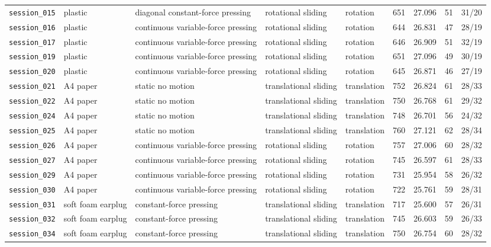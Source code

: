\documentclass[UTF8,a4paper,11pt]{ctexart}
\begin{document}
\begin{longtable}{lp{1.55cm}p{2.7cm}p{2.65cm}lrrrr}
\texttt{session\_015} & plastic & diagonal constant-force pressing & rotational sliding & rotation & 651 & 27.096 & 51 & 31/20 \\
\texttt{session\_016} & plastic & continuous variable-force pressing & rotational sliding & rotation & 644 & 26.831 & 47 & 28/19 \\
\texttt{session\_017} & plastic & continuous variable-force pressing & rotational sliding & rotation & 646 & 26.909 & 51 & 32/19 \\
\texttt{session\_019} & plastic & continuous variable-force pressing & rotational sliding & rotation & 651 & 27.096 & 49 & 30/19 \\
\texttt{session\_020} & plastic & continuous variable-force pressing & rotational sliding & rotation & 645 & 26.871 & 46 & 27/19 \\
\texttt{session\_021} & A4 paper & static no motion & translational sliding & translation & 752 & 26.824 & 61 & 28/33 \\
\texttt{session\_022} & A4 paper & static no motion & translational sliding & translation & 750 & 26.768 & 61 & 29/32 \\
\texttt{session\_024} & A4 paper & static no motion & translational sliding & translation & 748 & 26.701 & 56 & 24/32 \\
\texttt{session\_025} & A4 paper & static no motion & translational sliding & translation & 760 & 27.121 & 62 & 28/34 \\
\texttt{session\_026} & A4 paper & continuous variable-force pressing & rotational sliding & rotation & 757 & 27.006 & 60 & 28/32 \\
\texttt{session\_027} & A4 paper & continuous variable-force pressing & rotational sliding & rotation & 745 & 26.597 & 61 & 28/33 \\
\texttt{session\_029} & A4 paper & continuous variable-force pressing & rotational sliding & rotation & 731 & 25.954 & 58 & 26/32 \\
\texttt{session\_030} & A4 paper & continuous variable-force pressing & rotational sliding & rotation & 722 & 25.761 & 59 & 28/31 \\
\texttt{session\_031} & soft foam earplug & constant-force pressing & translational sliding & translation & 717 & 25.600 & 57 & 26/31 \\
\texttt{session\_032} & soft foam earplug & constant-force pressing & translational sliding & translation & 745 & 26.603 & 59 & 26/33 \\
\texttt{session\_034} & soft foam earplug & constant-force pressing & translational sliding & translation & 750 & 26.754 & 60 & 28/32 \\

\end{longtable}
\end{document}
